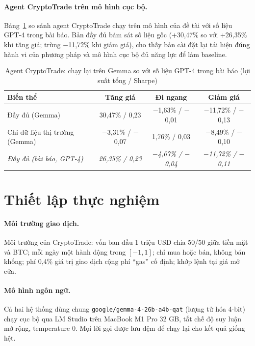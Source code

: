 \paragraph{Agent CryptoTrade trên mô hình cục bộ.} Bảng~\ref{tab:ct-repro} so sánh agent CryptoTrade chạy trên mô
hình của đề tài với số liệu GPT-4 trong bài báo. Bản đầy đủ bám sát số liệu gốc (+30,47\% so với +26,35\% khi tăng giá;
trùng $-$11,72\% khi giảm giá), cho thấy bản cài đặt lại tái hiện đúng hành vi của phương pháp và mô hình cục bộ đủ năng
lực để làm baseline.

\begin{table}[H]
\centering
\caption{Agent CryptoTrade: chạy lại trên Gemma so với số liệu GPT-4 trong bài báo (lợi suất tổng / Sharpe)}
\label{tab:ct-repro}
\begin{tabular}{lccc}
\toprule
Biến thể & Tăng giá & Đi ngang & Giảm giá \\
\midrule
Đầy đủ (Gemma) & 30,47\% / 0,23 & $-$1,63\% / $-$0,01 & $-$11,72\% / $-$0,13 \\
Chỉ dữ liệu thị trường (Gemma) & $-$3,31\% / $-$0,07 & 1,76\% / 0,03 & $-$8,49\% / $-$0,10 \\
\textit{Đầy đủ (bài báo, GPT-4)} & \textit{26,35\% / 0,23} & \textit{$-$4,07\% / $-$0,04} & \textit{$-$11,72\% / $-$0,11} \\
\bottomrule
\end{tabular}
\end{table}

\section{Thiết lập thực nghiệm}
\paragraph{Môi trường giao dịch.} Môi trường của CryptoTrade: vốn ban đầu 1 triệu USD chia 50/50 giữa tiền mặt và BTC;
mỗi ngày một hành động trong $[-1,1]$; chỉ mua hoặc bán, không bán khống; phí 0,4\% giá trị giao dịch cộng phí ``gas''
cố định; khớp lệnh tại giá mở cửa.

\paragraph{Mô hình ngôn ngữ.} Cả hai hệ thống dùng chung \texttt{google/gemma-4-26b-a4b-qat} (lượng tử hóa 4-bit) chạy
cục bộ qua LM Studio trên MacBook M1 Pro 32 GB, tắt chế độ suy luận mở rộng, temperature 0. Mọi lời gọi được lưu
đệm để chạy lại cho kết quả giống hệt.

